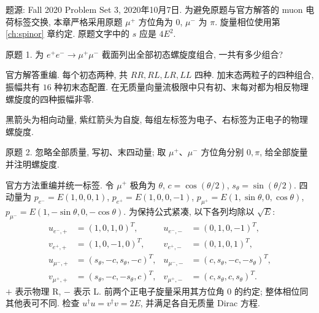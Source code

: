 题源: Fall 2020 Problem Set 3, 2020年10月7日. 为避免原题与官方解答的 muon 电荷标签交换, 本章严格采用原题 $\mu^+$ 方位角为 $0$, $\mu^-$ 为 $\pi$. 旋量相位使用第 \ref{ch:spinor} 章约定. 原题文字中的 $s$ 应是 $4E^2$.

\begin{exercise}\label{ex:8701-3-1}
原题 1. 为 $e^+e^-\to\mu^+\mu^-$ 截面列出全部初态螺旋度组合, 一共有多少组合?
\end{exercise}
\begin{solution}
官方解答重编. 每个初态两种, 共 $RR,RL,LR,LL$ 四种. 加末态两粒子的四种组合, 振幅共有 $16$ 种初末态配置. 在无质量向量流极限中只有初、末每对都为相反物理螺旋度的四种振幅非零.
\begin{center}\end{center}
黑箭头为相向动量, 紫红箭头为自旋, 每组左标签为电子、右标签为正电子的物理螺旋度.
\end{solution}
\begin{exercise}\label{ex:8701-3-2}
原题 2. 忽略全部质量, 写初、末四动量; 取 $\mu^+$、$\mu^-$ 方位角分别 $0,\pi$, 给全部旋量并注明螺旋度.
\end{exercise}
\begin{solution}
官方方法重编并统一标签. 令 $\mu^+$ 极角为 $\theta$, $c=\cos(\theta/2)$, $s_\theta=\sin(\theta/2)$. 四动量为
$p_{e^-}=E(1,0,0,1)$, $p_{e^+}=E(1,0,0,-1)$,
$p_{\mu^+}=E(1,\sin\theta,0,\cos\theta)$,
$p_{\mu^-}=E(1,-\sin\theta,0,-\cos\theta)$. 为保持公式紧凑, 以下各列均除以 $\sqrt E$:
\begin{align*}
 u_{e^-,+}&=(1,0,1,0)^T,&u_{e^-,-}&=(0,1,0,-1)^T,\\
 v_{e^+,+}&=(1,0,-1,0)^T,&v_{e^+,-}&=(0,1,0,1)^T,\\
 u_{\mu^-,+}&=(s_\theta,-c,s_\theta,-c)^T,
 &u_{\mu^-,-}&=(c,s_\theta,-c,-s_\theta)^T,\\
 v_{\mu^+,+}&=(s_\theta,-c,-s_\theta,c)^T,
 &v_{\mu^+,-}&=(c,s_\theta,c,s_\theta)^T.
\end{align*}
$+$ 表示物理 R, $-$ 表示 L. 前两个正电子旋量采用其方位角 $0$ 的约定; 整体相位同其他表可不同. 检查 $u^\dagger u=v^\dagger v=2E$, 并满足各自无质量 Dirac 方程.
\end{solution}
